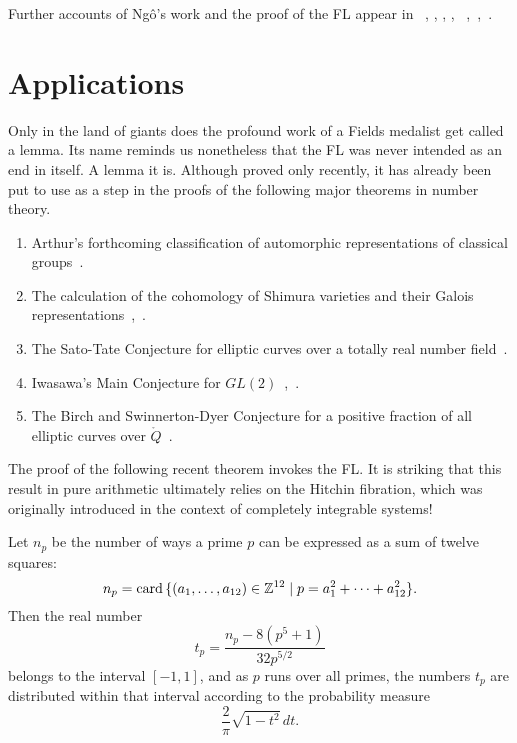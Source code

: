 Further accounts of Ng\^o's work and the proof of the FL appear in
~\cite{Nadler:2010}, \cite{Dat:2004}, \cite{Arthur:2010},
\cite{DN:2010},
~\cite{CHLaumon:2010},~\cite{Cass:2010},~\cite{NBC:report:2010}.




\section{Applications}

Only in the land of giants does the profound work of a Fields medalist get
called a lemma.  Its name reminds us nonetheless that the FL was never
intended as an end in itself.  A lemma it is.  Although proved only
recently, it has already been put to use as a step in the proofs of
the following major theorems in number theory.

\begin{enumerate}
\item Arthur's forthcoming classification of automorphic
  representations of classical groups~\cite{Arthur:2011}.
\item The calculation of the cohomology of Shimura
  varieties and their Galois representations~\cite{Morel:2010},~\cite{Shin:2010}.
\item The Sato-Tate Conjecture for elliptic curves over a totally real
  number field~\cite{BGHT:2010}.
\item Iwasawa's Main Conjecture for
  $GL(2)$~\cite{Skinner-Urban:2010},~\cite{Skinner:2010}.
\item The Birch and Swinnerton-Dyer Conjecture  for a
positive fraction of all elliptic curves over $\ring{Q}$~\cite{BS:2010}.
\end{enumerate}

The proof of the following recent theorem invokes the FL.  
It is striking that this result in pure
arithmetic ultimately relies on the Hitchin fibration, which
was originally introduced in the context of completely integrable
systems!

\begin{thm} 
  Let $n_p$ be the number of ways a prime $p$ can be expressed as a
  sum of twelve squares:
\[
n_p = {\operatorname{card}}\,\{ (a_1,\ldots,a_{12})\in\mathbb{Z}^{12} \mid p = a_1^2 +\cdots +
  a_{12}^2 \}.
\]
Then the real number
\[
t_p = \frac{n_p -  8 (p^5 + 1)}{32 p^{5/2}}
\]
belongs to the interval $[-1,1]$, and as $p$ runs over all primes, the
numbers $t_p$ are distributed within that interval according to the
probability measure
\[
\frac{2}{\pi} \sqrt{1-t^2} \, dt.
\]
\end{thm}


